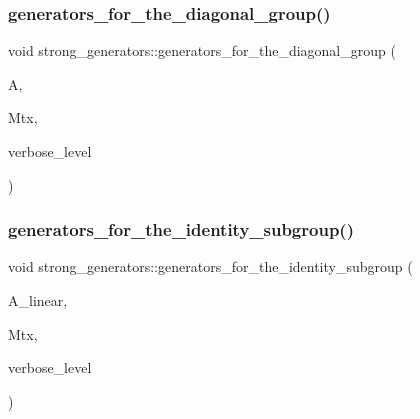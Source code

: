 \mbox{\label{classstrong__generators_a560ff860f139f7f02f293fa7f5f01aff}} 
\subsubsection{\texorpdfstring{generators\+\_\+for\+\_\+the\+\_\+diagonal\+\_\+group()}{generators\_for\_the\_diagonal\_group()}}
{\footnotesize\ttfamily void strong\+\_\+generators\+::generators\+\_\+for\+\_\+the\+\_\+diagonal\+\_\+group (\begin{DoxyParamCaption}\item[{\mbox{\hyperlink{classaction}{action}} $\ast$}]{A,  }\item[{\mbox{\hyperlink{classmatrix__group}{matrix\+\_\+group}} $\ast$}]{Mtx,  }\item[{\mbox{\hyperlink{galois_8h_a09fddde158a3a20bd2dcadb609de11dc}{I\+NT}}}]{verbose\+\_\+level }\end{DoxyParamCaption})}

\mbox{\label{classstrong__generators_a6af2f0c5e1700eefbaf90ff38892eecc}} 
\subsubsection{\texorpdfstring{generators\+\_\+for\+\_\+the\+\_\+identity\+\_\+subgroup()}{generators\_for\_the\_identity\_subgroup()}}
{\footnotesize\ttfamily void strong\+\_\+generators\+::generators\+\_\+for\+\_\+the\+\_\+identity\+\_\+subgroup (\begin{DoxyParamCaption}\item[{\mbox{\hyperlink{classaction}{action}} $\ast$}]{A\+\_\+linear,  }\item[{\mbox{\hyperlink{classmatrix__group}{matrix\+\_\+group}} $\ast$}]{Mtx,  }\item[{\mbox{\hyperlink{galois_8h_a09fddde158a3a20bd2dcadb609de11dc}{I\+NT}}}]{verbose\+\_\+level }\end{DoxyParamCaption})}

